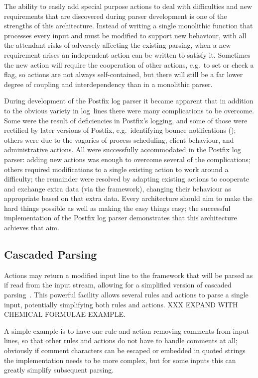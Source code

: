 The ability to easily add special purpose actions to deal with difficulties
and new requirements that are discovered during parser development is one
of the strengths of this architecture.  Instead of writing a single
monolithic function that processes every input and must be modified to
support new behaviour, with all the attendant risks of adversely affecting
the existing parsing, when a new requirement arises an independent action
can be written to satisfy it.  Sometimes the new action will require the
cooperation of other actions, e.g.\ to set or check a flag, so actions are
not always self-contained, but there will still be a far lower degree of
coupling and interdependency than in a monolithic parser.

During development of the Postfix log parser it became apparent that in
addition to the obvious variety in log~lines there were many complications
to be overcome.  Some were the result of deficiencies in Postfix's logging,
and some of those were rectified by later versions of Postfix, e.g.\
identifying bounce notifications
(); others were due to the
vagaries of process scheduling, client behaviour, and administrative
actions.  All were successfully accommodated in the Postfix log parser:
adding new actions was enough to overcome several of the complications;
others required modifications to a single existing action to work around a
difficulty; the remainder were resolved by adapting existing actions to
cooperate and exchange extra data (via the framework), changing their
behaviour as appropriate based on that extra data.  Every architecture
should aim to make the hard things possible as well as making the easy
things easy; the successful implementation of the Postfix log parser
demonstrates that this architecture achieves that aim.

\subsection{Cascaded Parsing}

\label{cascaded parsing}

Actions may return a modified input line to the framework that will be
parsed as if read from the input stream, allowing for a simplified version
of cascaded parsing~\cite{cascaded-parsing}.  This powerful facility allows
several rules and actions to parse a single input, potentially simplifying
both rules and actions.  XXX EXPAND WITH CHEMICAL FORMULAE EXAMPLE\@.

A simple example is to have one rule and action removing comments from
input lines, so that other rules and actions do not have to handle comments
at all; obviously if comment characters can be escaped or embedded in
quoted strings the implementation needs to be more complex, but for some
inputs this can greatly simplify subsequent parsing.

